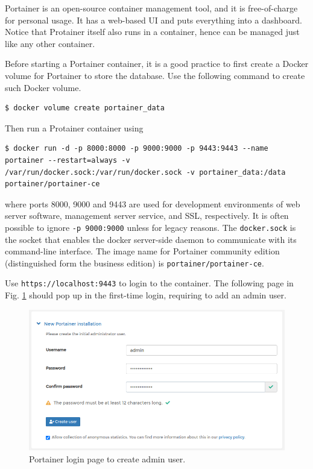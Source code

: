 Portainer is an open-source container management tool, and it is free-of-charge for personal usage. It has a web-based UI and puts everything into a dashboard. Notice that Protainer itself also runs in a container, hence can be managed just like any other container.

Before starting a Portainer container, it is a good practice to first create a Docker volume for Portainer to store the database. Use the following command to create such Docker volume.
\begin{lstlisting}
$ docker volume create portainer_data
\end{lstlisting}
Then run a Protainer container using
\begin{lstlisting}
$ docker run -d -p 8000:8000 -p 9000:9000 -p 9443:9443 --name portainer --restart=always -v /var/run/docker.sock:/var/run/docker.sock -v portainer_data:/data portainer/portainer-ce
\end{lstlisting}
where ports 8000, 9000 and 9443 are used for development environments of web server software, management server service, and SSL, respectively. It is often possible to ignore \verb|-p 9000:9000| unless for legacy reasons.  The \verb|docker.sock| is the socket that enables the docker server-side daemon to communicate with its command-line interface. The image name for Portainer community edition (distinguished form the business edition) is \verb|portainer/portainer-ce|.

Use \verb|https://localhost:9443| to login to the container. The following page in Fig. \ref{ch:vac:fig:portainerlogin} should pop up in the first-time login, requiring to add an admin user.
\begin{figure}
	\centering
	\includegraphics[width=350pt]{chapters/ch-virtualization-and-containerization/figures/portainerlogin.png}
	\caption{Portainer login page to create admin user.} \label{ch:vac:fig:portainerlogin}
\end{figure}


